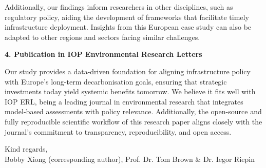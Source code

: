 \documentclass[10pt,a4paper,roman]{moderncv}        %
\begin{document}
Additionally, our findings inform researchers in other disciplines, such as regulatory policy, aiding the development of frameworks that facilitate timely infrastructure deployment. Insights from this European case study can also be adapted to other regions and sectors facing similar challenges.

\textbf{4. Publication in IOP Environmental Research Letters} 

Our study provides a data-driven foundation for aligning infrastructure policy with Europe's long-term decarbonisation goals, ensuring that strategic investments today yield systemic benefits tomorrow.  We believe it fits well with IOP ERL, being a leading journal in environmental research that integrates model-based assessments with policy relevance. Additionally, the open-source and fully reproducible scientific workflow of this research paper aligns closely with the journal’s commitment to transparency, reproducibility, and open access.

Kind regards,\\
Bobby Xiong (corresponding author), Prof. Dr. Tom Brown \& Dr. Iegor Riepin
\end{document}
